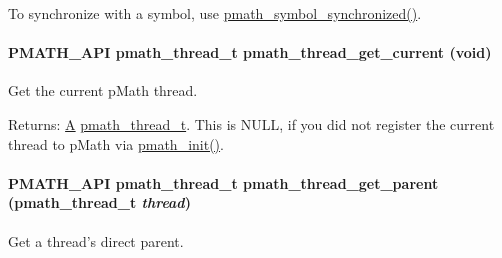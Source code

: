 To synchronize with a symbol, use \hyperlink{group__symbols_g95b141d9cb33fba80d6a807f304ee3b7}{pmath\_\-symbol\_\-synchronized()}. \hypertarget{group__threads_g908b6ee94115539a20530cfb051dc52c}{
\paragraph[{pmath\_\-thread\_\-get\_\-current}]{\setlength{\rightskip}{0pt plus 5cm}PMATH\_\-API {\bf pmath\_\-thread\_\-t} pmath\_\-thread\_\-get\_\-current (void)}\hfill}
\label{group__threads_g908b6ee94115539a20530cfb051dc52c}


Get the current pMath thread. 

\begin{Desc}
\item[Returns:]\hyperlink{class_a}{A} \hyperlink{classpmath__thread__t}{pmath\_\-thread\_\-t}. This is NULL, if you did not register the current thread to pMath via \hyperlink{group__frontend_gfb9f2c789bee5295c6794d16c0164943}{pmath\_\-init()}. \end{Desc}
\hypertarget{group__threads_gb0e137fb921f9b329a8a9e7c4efa3b3d}{
\paragraph[{pmath\_\-thread\_\-get\_\-parent}]{\setlength{\rightskip}{0pt plus 5cm}PMATH\_\-API {\bf pmath\_\-thread\_\-t} pmath\_\-thread\_\-get\_\-parent ({\bf pmath\_\-thread\_\-t} {\em thread})}\hfill}
\label{group__threads_gb0e137fb921f9b329a8a9e7c4efa3b3d}


Get a thread's direct parent. 

